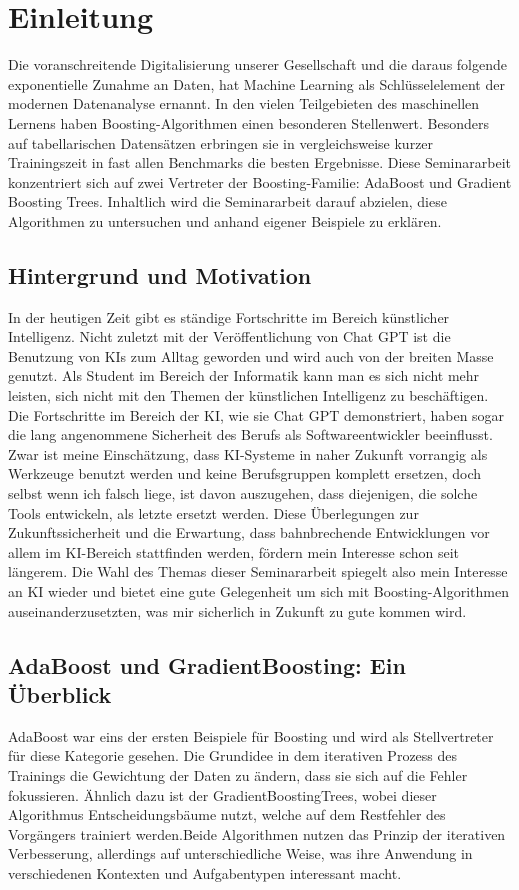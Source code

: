 \section{Einleitung}
Die voranschreitende Digitalisierung unserer Gesellschaft und die daraus folgende exponentielle Zunahme an Daten, hat Machine Learning als Schlüsselelement der modernen Datenanalyse ernannt. In den vielen Teilgebieten des maschinellen Lernens haben Boosting-Algorithmen einen besonderen Stellenwert. Besonders auf tabellarischen Datensätzen erbringen sie in vergleichsweise kurzer Trainingszeit in fast allen Benchmarks die besten Ergebnisse. Diese Seminararbeit konzentriert sich auf zwei Vertreter der Boosting-Familie: AdaBoost und Gradient Boosting Trees. Inhaltlich wird die Seminararbeit darauf abzielen, diese Algorithmen zu untersuchen und anhand eigener Beispiele zu erklären.

\subsection{Hintergrund und Motivation}
In der heutigen Zeit gibt es ständige Fortschritte im Bereich künstlicher Intelligenz. Nicht zuletzt mit der Veröffentlichung von Chat GPT ist die Benutzung von KIs zum Alltag geworden und wird auch von der breiten Masse genutzt. Als Student im Bereich der Informatik kann man es sich nicht mehr leisten, sich nicht mit den Themen der künstlichen Intelligenz zu beschäftigen. Die Fortschritte im Bereich der KI, wie sie Chat GPT demonstriert, haben sogar die lang angenommene Sicherheit des Berufs als Softwareentwickler beeinflusst. Zwar ist meine Einschätzung, dass KI-Systeme in naher Zukunft vorrangig als Werkzeuge benutzt werden und keine Berufsgruppen komplett ersetzen, doch selbst wenn ich falsch liege, ist davon auszugehen, dass diejenigen, die solche Tools entwickeln, als letzte ersetzt werden. Diese Überlegungen zur Zukunftssicherheit und die Erwartung, dass bahnbrechende Entwicklungen vor allem im KI-Bereich stattfinden werden, fördern mein Interesse schon seit längerem. Die Wahl des Themas dieser Seminararbeit spiegelt also mein Interesse an KI wieder und bietet eine gute Gelegenheit um sich mit Boosting-Algorithmen auseinanderzusetzten, was mir sicherlich in Zukunft zu gute kommen wird.

\subsection{AdaBoost und GradientBoosting: Ein Überblick}
AdaBoost war eins der ersten Beispiele für Boosting und wird als Stellvertreter für diese Kategorie gesehen. Die Grundidee in dem iterativen Prozess des Trainings die Gewichtung der Daten zu ändern, dass sie sich auf die Fehler fokussieren. Ähnlich dazu ist der GradientBoostingTrees, wobei dieser Algorithmus Entscheidungsbäume nutzt, welche auf dem Restfehler des Vorgängers trainiert werden.Beide Algorithmen nutzen das Prinzip der iterativen Verbesserung, allerdings auf unterschiedliche Weise, was ihre Anwendung in verschiedenen Kontexten und Aufgabentypen interessant macht.

